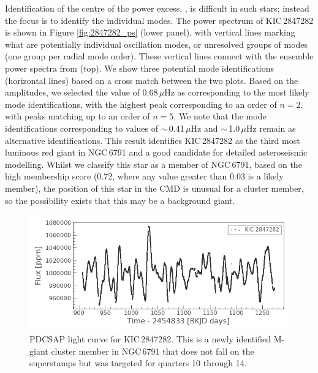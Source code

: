 Identification of the centre of the power excess, \numax{}, is difficult in such stars; instead the focus is to identify the individual modes. The power spectrum of KIC\,2847282 is shown in Figure \ref{fig:2847282_ps} (lower panel), with vertical lines marking what are potentially individual oscillation modes, or unresolved groups of modes (one group per radial mode order). These vertical lines connect with the ensemble power spectra from \cite{yu_asteroseismology_2020} (top). We show three potential mode identifications (horizontal lines) based on a cross match between the two plots. Based on the amplitudes, we selected the \numax{} value of 0.68\,$\mu$Hz as corresponding to the most likely mode identifications, with the highest peak corresponding to an order of $n = 2$, with peaks matching up to an order of $n = 5$. We note that the mode identifications corresponding to \numax{} values of $\sim$\,0.41\,$\mu$Hz and $\sim$\,1.0\,$\mu$Hz remain as alternative identifications. This result identifies KIC\,2847282 as the third most luminous red giant in NGC\,6791 and a good candidate for detailed asteroseismic modelling. Whilst we classify this star as a member of NGC\,6791, based on the high membership score (0.72, where any value greater than 0.03 is a likely member), the position of this star in the CMD is unusual for a cluster member, so the possibility exists that this may be a background giant.

\begin{figure}
    \centering
    \includegraphics[width=\linewidth]{Chapter5/2847282_MGiant_lc.png}
    \caption[PDCSAP light curve for the new M-giant, KIC\,2847282]{PDCSAP light curve for KIC\,2847282. This is a newly identified M-giant cluster member in NGC\,6791 that does not fall on the superstamps but was targeted for quarters 10 through 14.}
    \label{fig:2847282_lc}
\end{figure}

